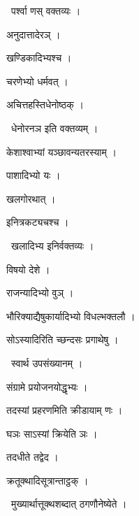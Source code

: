 \documentclass[10pt, openany, oneside]{book}
\begin{document}
\par\noindent\hspace{1.5em}{\vps वा॰}~{\qt पर्श्वा णस् वक्तव्यः ।}

\noindent अनुदात्तादेरञ् ।

\noindent खण्डिकादिभ्यश्च ।

\noindent चरणेभ्यो धर्मवत् ।

\noindent अचित्तहस्तिधेनोष्ठक् ।

\par\noindent\hspace{1.5em}{\vps वा॰}~{\qt धेनोरनञ इति वक्तव्यम् ।}

\noindent केशाश्वाभ्यां यञ्छावन्यतरस्याम् ।

\noindent पाशादिभ्यो यः ।

\noindent खलगोरथात् ।

\noindent इनित्रकट्यचश्च ।

\par\noindent\hspace{1.5em}{\vps वा॰}~{\qt खलादिभ्य इनिर्वक्तव्यः ।}

\noindent विषयो देशे ।

\noindent राजन्यादिभ्यो वुञ् ।

\noindent भौरिक्याद्यैषुकार्यादिभ्यो विधल्भक्तलौ ।

\noindent सोऽस्यादिरिति च्छन्दसः प्रगाथेषु ।

\par\noindent\hspace{1.5em}{\vps वा॰}~{\qt स्वार्थ उपसंख्यानम् ।}

\noindent संग्रामे प्रयोजनयोद्धृभ्यः ।

\noindent तदस्यां प्रहरणमिति क्रीडायाम् णः ।

\noindent घञः साऽस्यां क्रियेति ञः ।

\noindent तदधीते तद्वेद ।

\noindent क्रतूक्थादिसूत्रान्ताट्ठक् ।

\par\noindent\hspace{1.5em}{\vps वा॰}~{\qt मुख्यार्थात्तूक्थशब्दात् ठगणौनेष्येते ।}
\end{document}
